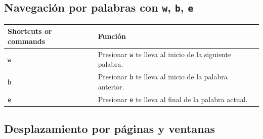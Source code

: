 \documentclass[
  doc,
  floatsintext,
  longtable,
  a4paper,
  nolmodern,
  notxfonts,
  notimes,
  12pt,
  colorlinks=true,linkcolor=blue,citecolor=blue,urlcolor=blue]{apa7}
\newcounter{none} %
\begin{document}
\subsection{\texorpdfstring{Navegación por palabras con \texttt{w},
\texttt{b},
\texttt{e}}{Navegación por palabras con w, b, e}}\label{navegaciuxf3n-por-palabras-con-w-b-e}

{\def\LTcaptype{none} %
\begin{longtable}[]{@{}
  >{\raggedright\arraybackslash}p{}
  >{\raggedright\arraybackslash}p{}@{}}
\toprule\noalign{}
\begin{minipage}[b]{\linewidth}\raggedright
Shortcuts or commands
\end{minipage} & \begin{minipage}[b]{\linewidth}\raggedright
Función
\end{minipage} \\
\midrule\noalign{}
\endhead
\bottomrule\noalign{}
\endlastfoot
\texttt{w} & Presionar \texttt{w} te lleva al inicio de la siguiente
palabra. \\
\texttt{b} & Presionar \texttt{b} te lleva al inicio de la palabra
anterior. \\
\texttt{e} & Presionar \texttt{e} te lleva al final de la palabra
actual. \\
\end{longtable}
}

\subsection{Desplazamiento por páginas y
ventanas}\label{desplazamiento-por-puxe1ginas-y-ventanas}
\end{document}
